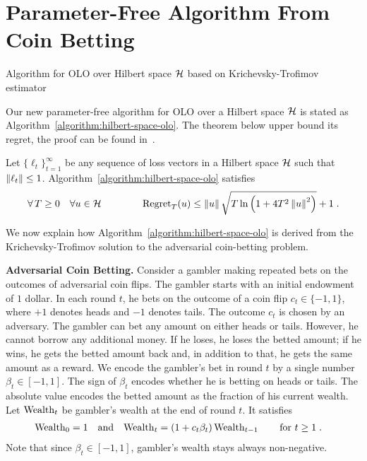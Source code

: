 \section{Parameter-Free Algorithm From Coin Betting}
\label{section:algorithms}

\begin{algorithm}[t]
\caption{Algorithm for OLO over Hilbert space $\mathcal{H}$ based on Krichevsky-Trofimov estimator
\label{algorithm:hilbert-space-olo}}
\begin{algorithmic}[1]
{
\ENDFOR
}
\end{algorithmic}
\end{algorithm}

Our new parameter-free algorithm for \ac{OLO} over a Hilbert space $\mathcal{H}$ is stated as
Algorithm~\ref{algorithm:hilbert-space-olo}.  The theorem below upper bound its
regret, the proof can be found in~\cite{Orabona-Pal-2016-parameter-free}.

\begin{theorem}
\label{theorem:hilbert-space-olo-regret}
Let $\{\ell_t\}_{t=1}^\infty$ be any sequence of loss vectors
in a Hilbert space $\mathcal{H}$ such that $\left\|{\ell_t}\right\| \le 1$.
Algorithm~\ref{algorithm:hilbert-space-olo} satisfies
$$
\forall \, T \ge 0 \quad
\forall u \in \mathcal{H} \qquad \qquad
\operatorname{Regret}_T(u) \le \left\|{u}\right\| \sqrt{T \ln\left(1 + 4T^2 \left\|{u}\right\|^2 \right)} + 1 \;.
$$
\end{theorem}

We now explain how Algorithm~\ref{algorithm:hilbert-space-olo} is derived from the
Krichevsky-Trofimov solution to the adversarial coin-betting problem.

\textbf{Adversarial Coin Betting.}
Consider a gambler making repeated bets on the outcomes of adversarial coin
flips. The gambler starts with an initial endowment of $1$ dollar. In each
round $t$, he bets on the outcome of a coin flip $c_t \in \{-1,1\}$, where $+1$
denotes heads and $-1$ denotes tails.  The outcome $c_t$ is chosen by an
adversary.  The gambler can bet any amount on either heads or tails. However,
he cannot borrow any additional money. If he loses, he loses the betted amount;
if he wins, he gets the betted amount back and, in addition to that, he gets
the same amount as a reward.  We encode the gambler's bet in round $t$ by a
single number $\beta_t \in [-1,1]$. The sign of $\beta_t$ encodes whether he is
betting on heads or tails. The absolute value encodes the betted amount as the
fraction of his current wealth.  Let $\operatorname{Wealth}_t$ be gambler's wealth at the end
of round $t$. It satisfies
\begin{align}
\label{equation:wealth-recurrence}
\operatorname{Wealth}_0 & = 1 &
& \text{and} &
\operatorname{Wealth}_t & = (1 + c_t \beta_t) \operatorname{Wealth}_{t-1} \qquad \text{for $t \ge 1$} \; .
\end{align}
Note that since $\beta_t \in [-1,1]$, gambler's wealth stays always
non-negative.

